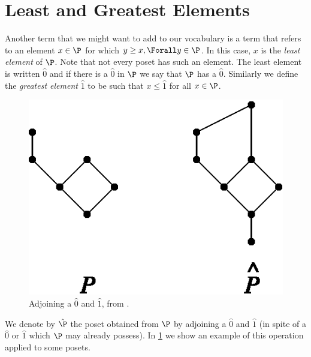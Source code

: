 \section{Least and Greatest Elements}
\label{tree:poset:leastandgreatest}

Another term that we might want to add to our vocabulary is a term that refers
to an element $x \in \P$ for which $y \geq x, \Forall y \in \P$. In this case,
$x$ is the \emph{least element} of \(\P\). Note that not every poset has such an
element. The least element is written $\hat{0}$ and if there is a $\hat{0}$ in
$\P$ we say that $\P$ has a $\hat{0}$. Similarly we define the \emph{greatest element}
$\hat{1}$ to be such that $x \leq \hat{1}$ for all $x \in \P$.

\begin{figure}
	\centering
	\includegraphics[height=0.2\textheight]{fig/stanley/3-3}
	\caption{\label{fig:stanley:3-3} Adjoining a $\hat{0}$ and $\hat{1}$, from
\citet*{Stanley:2011:ECV:2124415}.}
\end{figure}

We denote by \(\hat{\P}\) the poset obtained from \(\P\) by adjoining a
\(\hat{0}\) and \(\hat{1}\) (in spite of a \(\hat{0}\) or \(\hat{1}\) which
\(\P\) may already possess). In \ref{fig:stanley:3-3} we show an example of
this operation applied to some posets.
